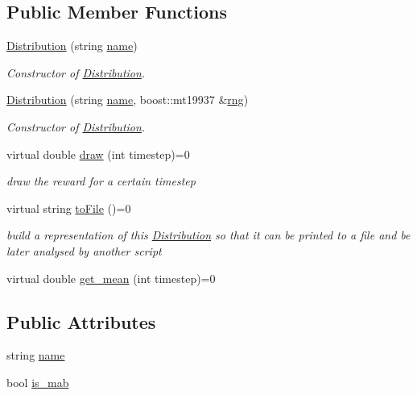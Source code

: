 \subsection*{Public Member Functions}
\begin{DoxyCompactItemize}
\item 
\mbox{\hyperlink{class_distribution_a7734801d8703a4d0f43a83d7439e5ca6}{Distribution}} (string \mbox{\hyperlink{class_distribution_ab3b7be02f0401cb76beb2e744b6161f9}{name}})
\begin{DoxyCompactList}\small\item\em Constructor of \mbox{\hyperlink{class_distribution}{Distribution}}. \end{DoxyCompactList}\item 
\mbox{\hyperlink{class_distribution_a405bc928b7710b5362c7070489a7362e}{Distribution}} (string \mbox{\hyperlink{class_distribution_ab3b7be02f0401cb76beb2e744b6161f9}{name}}, boost\+::mt19937 \&\mbox{\hyperlink{class_distribution_ac8915a45ce85ab6b7506fa42bb850a89}{rng}})
\begin{DoxyCompactList}\small\item\em Constructor of \mbox{\hyperlink{class_distribution}{Distribution}}. \end{DoxyCompactList}\item 
virtual double \mbox{\hyperlink{class_distribution_a742b398af4a461243028cce3c47d8080}{draw}} (int timestep)=0
\begin{DoxyCompactList}\small\item\em draw the reward for a certain timestep \end{DoxyCompactList}\item 
virtual string \mbox{\hyperlink{class_distribution_ac41d57a4d7f82041810f886590a236a5}{to\+File}} ()=0
\begin{DoxyCompactList}\small\item\em build a representation of this \mbox{\hyperlink{class_distribution}{Distribution}} so that it can be printed to a file and be later analysed by another script \end{DoxyCompactList}\item 
virtual double \mbox{\hyperlink{class_distribution_ac9c74d18549f532caa09ae86d8b25b55}{get\+\_\+mean}} (int timestep)=0
\end{DoxyCompactItemize}
\subsection*{Public Attributes}
\begin{DoxyCompactItemize}
\item 
string \mbox{\hyperlink{class_distribution_ab3b7be02f0401cb76beb2e744b6161f9}{name}}
\item 
bool \mbox{\hyperlink{class_distribution_a58fa80cadc13b26e12e9ed34aa8b926c}{is\+\_\+mab}}
\end{DoxyCompactItemize}
